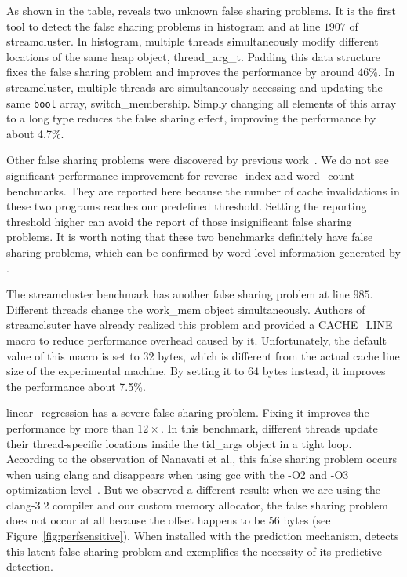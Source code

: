 As shown in the table, \Predator{} reveals two unknown false sharing problems. It is the first tool to detect the false sharing problems in histogram and at line $1907$ of streamcluster. 
In histogram, multiple threads simultaneously modify different locations of the same heap object, thread\_arg\_t. 
Padding this data structure fixes the false sharing problem and improves the performance by around 46\%. In streamcluster, multiple threads are simultaneously accessing and updating the same \texttt{bool} array, switch\_membership. Simply changing all elements of this array to a long type reduces the false sharing effect, improving the performance by about 4.7\%.

Other false sharing problems were discovered by previous work~\cite{sheriff}. We do not see significant performance improvement for reverse\_index and word\_count benchmarks. They are reported here because the number of cache invalidations in these two programs reaches our predefined threshold.
Setting the reporting threshold higher can avoid the report of those insignificant false sharing problems.
It is worth noting that these two benchmarks definitely have false sharing problems,
which can be confirmed by word-level information generated by \Predator{}. 

The streamcluster benchmark has another false sharing problem at line $985$. Different threads change the work\_mem object simultaneously. Authors of streamclsuter have already realized this problem and provided a CACHE\_LINE macro to reduce performance overhead caused by it. Unfortunately, the default value of this macro is set to $32$ bytes, which is different from the actual cache line size of the experimental machine. By setting it to $64$ bytes instead, it improves the  performance about 7.5\%.

linear\_regression has a severe false sharing problem. Fixing it improves the performance by more than $12\times$. In this benchmark, different threads update their thread-specific locations inside the tid\_args object in a tight loop. According to the observation of Nanavati et al., this false sharing problem occurs when using clang and disappears when using gcc with the -O2 and -O3 optimization level~\cite{OSdetection}. But we observed a different result: when we are using the clang-3.2 compiler and our custom memory allocator, the false sharing problem does not occur at all because the offset happens to be 56 bytes (see Figure~\ref{fig:perfsensitive}). When installed with the prediction mechanism, \Predator{} detects this latent false sharing problem and exemplifies the necessity of its predictive detection. 

